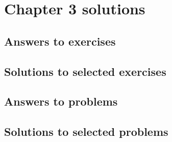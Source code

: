 \documentclass[letterpaper,oneside]{book}
\begin{document}
	
	\section*{Chapter 3 solutions}
	\label{sec:chapter3sols}	
	{ \footnotesize 

		\subsection*{Answers to exercises}

		\subsection*{Solutions to selected exercises}
		
		\subsection*{Answers to problems}

		\subsection*{Solutions to selected problems}

	}



\else
\fi
\end{document}
